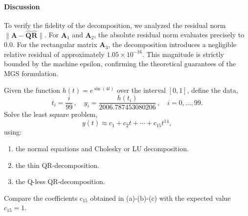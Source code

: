 \begin{solution}
	\paragraph{Discussion}
	To verify the fidelity of the decomposition, we analyzed the residual norm
	$\|\mathbf{A} - \hat{\mathbf{Q}}\hat{\mathbf{R}}\|$. For $\mathbf{A}_1$ and
	$\mathbf{A}_2$, the absolute residual norm evaluates precisely to $0.0$. For
	the rectangular matrix $\mathbf{A}_3$, the decomposition introduces a
	negligible relative residual of approximately $1.05 \times 10^{-16}$. This
	magnitude is strictly bounded by the machine epsilon, confirming the
	theoretical guarantees of the MGS formulation.
\end{solution}

\begin{exercise}
	Given the function $h(t)=e^{\sin(4t)}$ over the interval $[0,1]$, define the
	data,
	\[
		t_i = \frac{i}{99}\,,
		\quad
		y_i = \frac{h(t_i)}{2006.787453080206}\,,
		\quad i=0,\ldots,99.
	\]
	Solve the least square problem,
	\[
		y(t) \approx c_1 + c_2t + \cdots + c_{15} t^{14},
	\]
	using:
	\begin{enumerate}[label=(\alph*)]
		\item the normal equations and Cholesky or LU decomposition.
		\item the thin QR-decomposition.
		\item the Q-less QR-decomposition.
	\end{enumerate}
	Compare the coefficients $c_{15}$ obtained in (a)-(b)-(c) with the expected
	value $c_{15}=1$.
\end{exercise}

